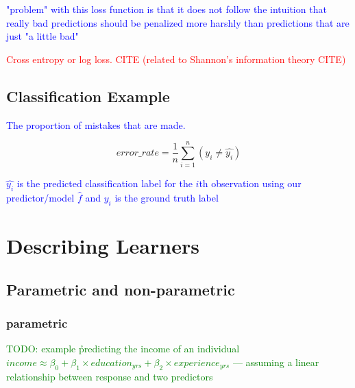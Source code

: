 \textcolor{blue}{"problem" with this loss function is that it does not follow the intuition that really bad predictions should be penalized more harshly than predictions that are just "a little bad"}

\textcolor{red}{Cross entropy or log loss. \textcolor{red}{CITE} (related to Shannon's information theory \textcolor{red}{CITE})}




\subsection{Classification Example}

\textcolor{blue}{The proportion of mistakes that are made.}

\begin{equation}
{error\_rate = \frac{1}{n}\sum_{i=1}^{n}(y_i \ne \hat{y_i})}
\label{eq:class_error_rate_def}
\end{equation}

\textcolor{blue}{$\hat{y_i}$ is the predicted classification label for the $i$th observation using our predictor/model $\hat{f}$ and $y_i$ is the ground truth label}

\section{Describing Learners}

\subsection{Parametric and non-parametric}

\subsubsection{parametric}


\textcolor{green}{TODO: example \r{predicting the income of an individual $income \approx \beta_0 + \beta_1 \times education_{yrs} + \beta_2 \times experience_{yrs}$ --- assuming a linear relationship between response and two predictors}}

